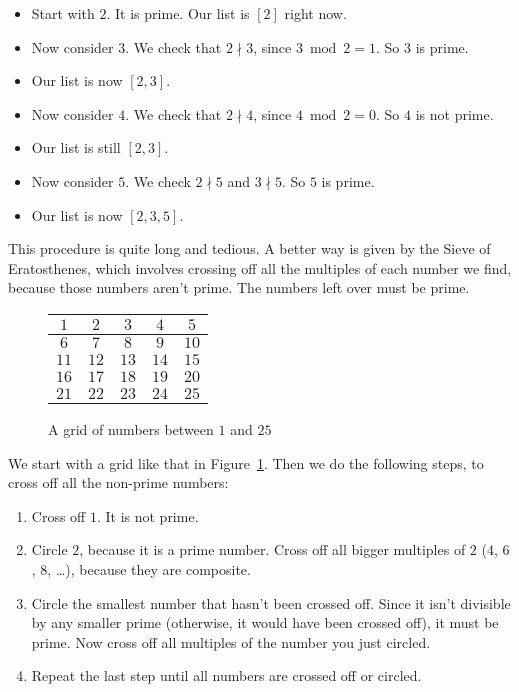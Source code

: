 \documentclass[a4paper,10pt]{report}
\begin{document}
\begin{itemize}
  \item Start with \(2\). It is prime. Our list is \([2]\) right now.
  \item Now consider \(3\). We check that \(2 \nmid 3\), since \(3 \bmod 2 =
  1\). So \(3\) is prime.
  \item Our list is now \([2, 3]\).
  \item Now consider \(4\). We check that \(2 \nmid 4\), since \(4 \bmod 2 =
  0\). So \(4\) is not prime.
  \item Our list is still \([2, 3]\).
  \item Now consider \(5\). We check \(2 \nmid 5\) and \(3 \nmid 5\). So \(5\)
  is prime.
  \item Our list is now \([2, 3, 5]\).
\end{itemize}

This procedure is quite long and tedious. A better way is given by the Sieve of
Eratosthenes, which involves crossing off all the multiples of each number we
find, because those numbers aren't prime. The numbers left over must be prime.

\begin{figure}
  \begin{center}
   \def\arraystretch{1.7}
   \begin{tabular}{|c|c|c|c|c|}
    \hline
    \(1\) & \(2\) & \(3\) & \(4\) & \(5\) \\
    \hline
    \(6\) & \(7\) & \(8\) & \(9\) & \(10\) \\
    \hline
    \(11\) & \(12\) & \(13\) & \(14\) & \(15\) \\
    \hline
    \(16\) & \(17\) & \(18\) & \(19\) & \(20\) \\
    \hline
    \(21\) & \(22\) & \(23\) & \(24\) & \(25\) \\
    \hline
   \end{tabular}
  \end{center}

  \caption{A grid of numbers between \(1\) and \(25\)}
  \label{pn:sieve-initial-state}
\end{figure}

We start with a grid like that in Figure~\ref{pn:sieve-initial-state}. Then we
do the following steps, to cross off all the non-prime numbers:

\begin{enumerate}
 \item Cross off \(1\). It is not prime.
 \item Circle \(2\), because it is a prime number. Cross off all bigger multiples
 of \(2\) (\(4\), \(6\), \(8\), \dots), because they are composite.
 \item Circle the smallest number that hasn't been crossed off. Since it isn't
 divisible by any smaller prime (otherwise, it would have been crossed off),
 it must be prime. Now cross off all multiples of the number you just circled.
 \item Repeat the last step until all numbers are crossed off or circled.
\end{enumerate}
\end{document}

